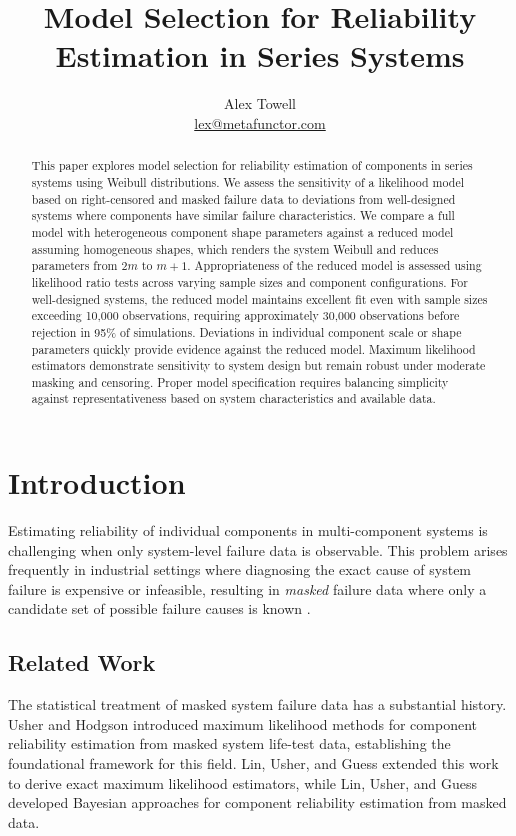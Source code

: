 \documentclass[11pt]{article}
\title{Model Selection for Reliability Estimation in Series Systems}
\author{
  \Large{Alex Towell} \\
  \href{mailto:lex@metafunctor.com}{lex@metafunctor.com}
}
\date{}
\begin{document}
\maketitle

\begin{abstract}
This paper explores model selection for reliability estimation of components in series systems using Weibull distributions. We assess the sensitivity of a likelihood model based on right-censored and masked failure data to deviations from well-designed systems where components have similar failure characteristics. We compare a full model with heterogeneous component shape parameters against a reduced model assuming homogeneous shapes, which renders the system Weibull and reduces parameters from $2m$ to $m+1$. Appropriateness of the reduced model is assessed using likelihood ratio tests across varying sample sizes and component configurations. For well-designed systems, the reduced model maintains excellent fit even with sample sizes exceeding 10,000 observations, requiring approximately 30,000 observations before rejection in 95\% of simulations. Deviations in individual component scale or shape parameters quickly provide evidence against the reduced model. Maximum likelihood estimators demonstrate sensitivity to system design but remain robust under moderate masking and censoring. Proper model specification requires balancing simplicity against representativeness based on system characteristics and available data.
\end{abstract}

\tableofcontents
\newpage

\section{Introduction}

Estimating reliability of individual components in multi-component systems is challenging when only system-level failure data is observable. This problem arises frequently in industrial settings where diagnosing the exact cause of system failure is expensive or infeasible, resulting in \emph{masked} failure data where only a candidate set of possible failure causes is known \cite{Fran-1991}.

\subsection{Related Work}

The statistical treatment of masked system failure data has a substantial history. Usher and Hodgson \cite{Usher-1988} introduced maximum likelihood methods for component reliability estimation from masked system life-test data, establishing the foundational framework for this field. Lin, Usher, and Guess \cite{Lin-1993} extended this work to derive exact maximum likelihood estimators, while Lin, Usher, and Guess \cite{Lin-1996} developed Bayesian approaches for component reliability estimation from masked data.
\end{document}
